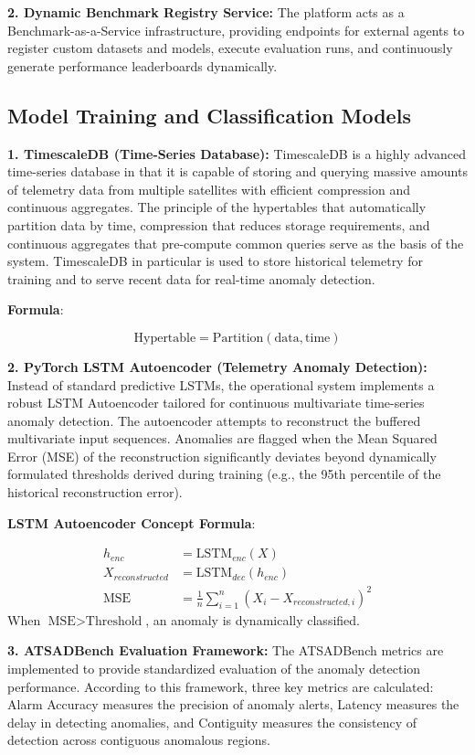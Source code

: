 \documentclass[conference]{IEEEtran}
\begin{document}
\textbf{2. Dynamic Benchmark Registry Service:} The platform acts as a Benchmark-as-a-Service infrastructure, providing endpoints for external agents to register custom datasets and models, execute evaluation runs, and continuously generate performance leaderboards dynamically.

\subsection{Model Training and Classification Models}

\textbf{1. TimescaleDB (Time-Series Database):} TimescaleDB is a highly advanced time-series database in that it is capable of storing and querying massive amounts of telemetry data from multiple satellites with efficient compression and continuous aggregates. The principle of the hypertables that automatically partition data by time, compression that reduces storage requirements, and continuous aggregates that pre-compute common queries serve as the basis of the system. TimescaleDB in particular is used to store historical telemetry for training and to serve recent data for real-time anomaly detection.

\textbf{Formula}:

$$\text{Hypertable} = \text{Partition}(\text{data}, \text{time})$$

\textbf{2. PyTorch LSTM Autoencoder (Telemetry Anomaly Detection):} Instead of standard predictive LSTMs, the operational system implements a robust LSTM Autoencoder tailored for continuous multivariate time-series anomaly detection. The autoencoder attempts to reconstruct the buffered multivariate input sequences. Anomalies are flagged when the Mean Squared Error (MSE) of the reconstruction significantly deviates beyond dynamically formulated thresholds derived during training (e.g., the 95th percentile of the historical reconstruction error).

\textbf{LSTM Autoencoder Concept Formula}:

\begin{align}
h_{enc} &= \text{LSTM}_{enc}(X)\\
X_{reconstructed} &= \text{LSTM}_{dec}(h_{enc})\\
\text{MSE} &= \frac{1}{n} \sum_{i=1}^{n} (X_i - X_{reconstructed, i})^2
\end{align}
When $\text{MSE} > \text{Threshold}$, an anomaly is dynamically classified.

\textbf{3. ATSADBench Evaluation Framework:} The ATSADBench metrics are implemented to provide standardized evaluation of the anomaly detection performance. According to this framework, three key metrics are calculated: Alarm Accuracy measures the precision of anomaly alerts, Latency measures the delay in detecting anomalies, and Contiguity measures the consistency of detection across contiguous anomalous regions.
\end{document}
